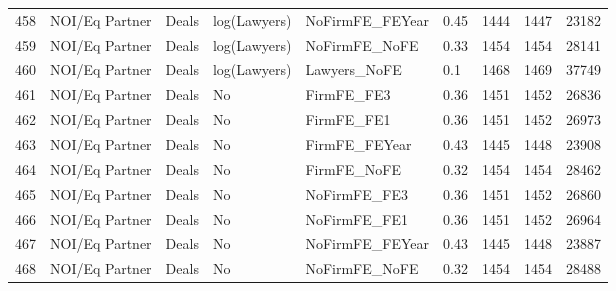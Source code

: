 \begin{table}[ht]
\begin{tabular}{rllllllll}
  458 & NOI/Eq Partner & Deals & log(Lawyers) & NoFirmFE\_FEYear & 0.45 & 1444 & 1447 & 23182 \\ 
  459 & NOI/Eq Partner & Deals & log(Lawyers) & NoFirmFE\_NoFE & 0.33 & 1454 & 1454 & 28141 \\ 
  460 & NOI/Eq Partner & Deals & log(Lawyers) & Lawyers\_NoFE & 0.1 & 1468 & 1469 & 37749 \\ 
  461 & NOI/Eq Partner & Deals & No & FirmFE\_FE3 & 0.36 & 1451 & 1452 & 26836 \\ 
  462 & NOI/Eq Partner & Deals & No & FirmFE\_FE1 & 0.36 & 1451 & 1452 & 26973 \\ 
  463 & NOI/Eq Partner & Deals & No & FirmFE\_FEYear & 0.43 & 1445 & 1448 & 23908 \\ 
  464 & NOI/Eq Partner & Deals & No & FirmFE\_NoFE & 0.32 & 1454 & 1454 & 28462 \\ 
  465 & NOI/Eq Partner & Deals & No & NoFirmFE\_FE3 & 0.36 & 1451 & 1452 & 26860 \\ 
  466 & NOI/Eq Partner & Deals & No & NoFirmFE\_FE1 & 0.36 & 1451 & 1452 & 26964 \\ 
  467 & NOI/Eq Partner & Deals & No & NoFirmFE\_FEYear & 0.43 & 1445 & 1448 & 23887 \\ 
  468 & NOI/Eq Partner & Deals & No & NoFirmFE\_NoFE & 0.32 & 1454 & 1454 & 28488 \\ 
   \hline
\end{tabular}
\end{table}
